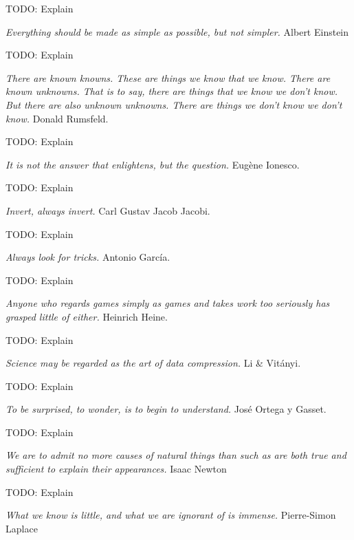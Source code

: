 {\color{red} TODO: Explain}

\bigskip

\emph{Everything should be made as simple as possible, but not simpler.} Albert Einstein

{\color{red} TODO: Explain}

\bigskip

\emph{There are known knowns. These are things we know that we know. There are known unknowns. That is to say, there are things that we know we don’t know. But there are also unknown
unknowns. There are things we don’t know we don’t know.} Donald Rumsfeld.

{\color{red} TODO: Explain}

\bigskip

\emph{It is not the answer that enlightens, but the question.} Eugène Ionesco.

{\color{red} TODO: Explain}

\bigskip

\emph{Invert, always invert.} Carl Gustav Jacob Jacobi.

{\color{red} TODO: Explain}

\bigskip

\emph{Always look for tricks.} Antonio García.

{\color{red} TODO: Explain}

\bigskip

\emph{Anyone who regards games simply as games and takes work too seriously has grasped little of either.} Heinrich Heine.

{\color{red} TODO: Explain}

\bigskip

\emph{Science may be regarded as the art of data compression.} Li \& Vitányi.

{\color{red} TODO: Explain}

\bigskip

\emph{To be surprised, to wonder, is to begin to understand.} José Ortega y Gasset.

{\color{red} TODO: Explain}

\bigskip

\emph{We are to admit no more causes of natural things than such as are both true and sufficient to explain their appearances.} Isaac Newton

{\color{red} TODO: Explain}

\bigskip

\emph{What we know is little, and what we are ignorant of is immense.} Pierre-Simon Laplace

